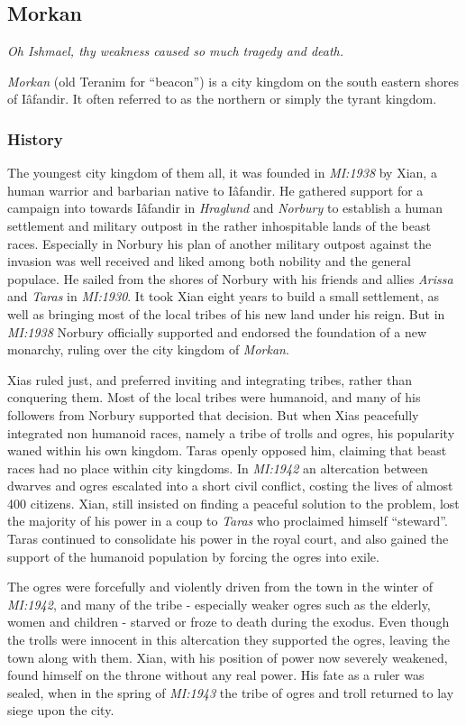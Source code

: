 \subsection{Morkan}

\emph{Oh Ishmael, thy weakness caused so much tragedy and death.}

\emph{Morkan} (old Teranim for ``beacon'') is a city kingdom on the south
eastern shores of Iâfandir. It often referred to as the northern or simply
the tyrant kingdom.

\subsubsection*{History}

The youngest city kingdom of them all, it was founded in \emph{MI:1938} by
Xian, a human warrior and barbarian native to Iâfandir. He gathered support
for a campaign into towards Iâfandir in \emph{Hraglund} and \emph{Norbury} to
establish a human settlement and military outpost in the rather inhospitable
lands of the beast races. Especially in Norbury his plan of another military
outpost against the invasion was well received and liked among both nobility
and the general populace. He sailed from the shores of Norbury with his friends
and allies \emph{Arissa} and \emph{Taras} in \emph{MI:1930}. It took Xian
eight years to build a small settlement, as well as bringing most of the local
tribes of his new land under his reign. But in \emph{MI:1938} Norbury
officially supported and endorsed the foundation of a new monarchy, ruling
over the city kingdom of \emph{Morkan}.

Xias ruled just, and preferred inviting and integrating tribes, rather than
conquering them.  Most of the local tribes were humanoid, and many of his
followers from Norbury supported that decision. But when Xias peacefully
integrated non humanoid races, namely a tribe of trolls and ogres, his
popularity waned within his own kingdom. Taras openly opposed him, claiming
that beast races had no place within city kingdoms. In \emph{MI:1942} an
altercation between dwarves and ogres escalated into a short civil conflict,
costing the lives of almost 400 citizens. Xian, still insisted on finding a
peaceful solution to the problem, lost the majority of his power in a coup to
\emph{Taras} who proclaimed himself ``steward''. Taras continued to
consolidate his power in the royal court, and also gained the support of the
humanoid population by forcing the ogres into exile.

The ogres were forcefully and violently driven from the town in the winter of
\emph{MI:1942}, and many of the tribe - especially weaker ogres such as the
elderly, women and children - starved or froze to death during the exodus. Even
though the trolls were innocent in this altercation they supported the ogres,
leaving the town along with them. Xian, with his position of power now
severely weakened, found himself on the throne without any real power. His
fate as a ruler was sealed, when in the spring of \emph{MI:1943} the tribe of
ogres and troll returned to lay siege upon the city. 

